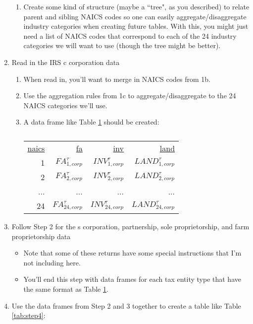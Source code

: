 \documentclass[a4paper]{article}
\begin{document}
\begin{enumerate}
\begin{enumerate}
	
	\item Create some kind of structure (maybe a ``tree", as you described) to relate parent and sibling NAICS codes so one can easily aggregate/disaggregate industry categories when creating future tables.  With this, you might just need a list of NAICS codes that correspond to each of the 24 industry categories we will want to use (though the tree might be better).
	\end{enumerate}
\item Read in the IRS c corporation data
	\begin{enumerate}
	\item When read in, you'll want to merge in NAICS codes from 1b.
	\item Use the aggregation rules from 1c to aggregate/disaggregate to the 24 NAICS categories we'll use.
	\item A data frame like Table \ref{tab:step2} should be created:
	
\begin{table}[h!]
  \centering
  \caption{}
    \begin{tabular}{rrrr}
    
   \underline{naics} & \underline{fa}    & \underline{inv}   & \underline{land} \\
    
    1     & $FA^{\tau}_{1,corp}$ & $INV^{\tau}_{1,corp}$ & $LAND^{\tau}_{1,corp}$ \\
    2     & $FA^{\tau}_{2,corp}$ & $INV^{\tau}_{2,corp}$ & $LAND^{\tau}_{2,corp}$ \\
    ...     & ...     & ...     & ... \\
    24    & $FA^{\tau}_{24,corp}$ & $INV^{\tau}_{24,corp}$ & $LAND^{\tau}_{24,corp}$ \\
    
    \end{tabular}%
  \label{tab:step2}%
\end{table}%

	
	\end{enumerate}
\item Follow Step 2 for the s corporation, partnership, sole proprietorship, and farm proprietorship data
	\begin{itemize}
	\item Note that some of these returns have some special instructions that I'm not including here.
	\item You'll end this step with data frames for each tax entity type that have the same format as Table \ref{tab:step2}.
	\end{itemize}
\item Use the data frames from Step 2 and 3 together to create a table like Table \ref{tab:step4}:


\end{enumerate}
\end{document}
